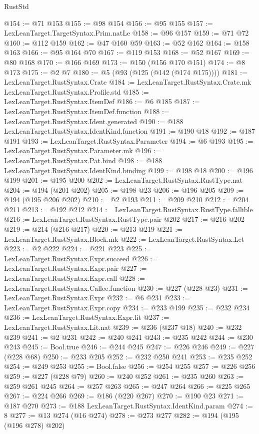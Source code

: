 \begin{lexlean}{RustStd}
\begin{coremodule}
@154 := @71 @153
@155 := @98 @154
@156 := @95 @155
@157 := LexLeanTarget.TargetSyntax.Prim.natLe
@158 := @96 @157
@159 := @71 @72
@160 := @112 @159
@162 := @47 @160 @59
@163 := @52 @162
@164 := @158 @163
@166 := @95 @164 @70
@167 := @119 @153
@168 := @52 @167
@169 := @80 @168
@170 := @166 @169
@173 := @150 (@156 @170 @151)
@174 := @8 @173
@175 := @2 @7
@180 := @5 (@93 (@125 (@142 (@174 @175))))
@181 := LexLeanTarget.RustSyntax.Crate
@184 := LexLeanTarget.RustSyntax.Crate.mk LexLeanTarget.RustSyntax.Profile.std
@185 := LexLeanTarget.RustSyntax.ItemDef
@186 := @6 @185
@187 := LexLeanTarget.RustSyntax.ItemDef.function
@188 := LexLeanTarget.RustSyntax.Ident.generated
@190 := @188 LexLeanTarget.RustSyntax.IdentKind.function
@191 := @190 @18
@192 := @187 @191
@193 := LexLeanTarget.RustSyntax.Parameter
@194 := @6 @193
@195 := LexLeanTarget.RustSyntax.Parameter.mk
@196 := LexLeanTarget.RustSyntax.Pat.bind
@198 := @188 LexLeanTarget.RustSyntax.IdentKind.binding
@199 := @198 @18
@200 := @196 @199
@201 := @195 @200
@202 := LexLeanTarget.RustSyntax.RustType.nat
@204 := @194 (@201 @202)
@205 := @198 @23
@206 := @196 @205
@209 := @194 (@195 @206 @202)
@210 := @2 @193
@211 := @209 @210
@212 := @204 @211
@213 := @192 @212
@214 := LexLeanTarget.RustSyntax.RustType.fallible
@216 := LexLeanTarget.RustSyntax.RustType.pair @202
@217 := @216 @202
@219 := @214 (@216 @217)
@220 := @213 @219
@221 := LexLeanTarget.RustSyntax.Block.mk
@222 := LexLeanTarget.RustSyntax.Let
@223 := @2 @222
@224 := @221 @223
@225 := LexLeanTarget.RustSyntax.Expr.succeed
@226 := LexLeanTarget.RustSyntax.Expr.pair
@227 := LexLeanTarget.RustSyntax.Expr.call
@228 := LexLeanTarget.RustSyntax.Callee.function
@230 := @227 (@228 @23)
@231 := LexLeanTarget.RustSyntax.Expr
@232 := @6 @231
@233 := LexLeanTarget.RustSyntax.Expr.copy
@234 := @233 @199
@235 := @232 @234
@236 := LexLeanTarget.RustSyntax.Expr.lit
@237 := LexLeanTarget.RustSyntax.Lit.nat
@239 := @236 (@237 @18)
@240 := @232 @239
@241 := @2 @231
@242 := @240 @241
@243 := @235 @242
@244 := @230 @243
@245 := Bool.true
@246 := @244 @245
@247 := @226 @246
@249 := @227 (@228 @68)
@250 := @233 @205
@252 := @232 @250 @241
@253 := @235 @252
@254 := @249 @253
@255 := Bool.false
@256 := @254 @255
@257 := @226 @256
@259 := @227 (@228 @79)
@260 := @240 @252
@261 := @235 @260
@263 := @259 @261 @245
@264 := @257 @263
@265 := @247 @264
@266 := @225 @265
@267 := @224 @266
@269 := @186 (@220 @267)
@270 := @190 @23
@271 := @187 @270
@273 := @188 LexLeanTarget.RustSyntax.IdentKind.param
@274 := 8
@277 := @13 @274 (@16 @274)
@278 := @273 @277
@282 := @194 (@195 (@196 @278) @202)

\end{coremodule}
\end{lexlean}
